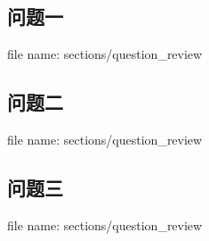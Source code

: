 \documentclass[../main.tex]{subfiles}
\begin{document}
\subsection{问题一}
  file name: sections/question\_review
\subsection{问题二}
  file name: sections/question\_review
\subsection{问题三}
  file name: sections/question\_review
\end{document}
